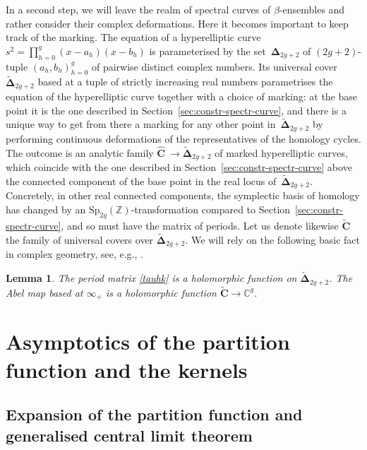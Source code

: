 \documentclass[10pt,a4paper]{amsart}
\numberwithin{equation}{section}
\newtheorem{Lemma}[Theorem]{Lemma}
\begin{document}
In a second step, we will leave the realm of spectral curves of
$\beta$-ensembles and rather consider their complex deformations. Here it becomes important to keep track of the marking.
The equation of a hyperelliptic curve $s^2 = \prod_{h = 0}^{g} (x - a_h)(x - b_h)$ is parameterised by the set~$\bm{\Delta}_{2g + 2}$ of $(2g + 2)$-tuple $(a_h,b_h)_{h = 0}^{g}$ of pairwise distinct complex numbers. Its universal cover~$\widetilde{\bm{\Delta}}_{2g + 2}$ based at a tuple of strictly increasing real numbers parametrises the equation of the hyperelliptic curve together with a choice of marking: at the base point it is the one described in Section~\ref{sec:constr-spectr-curve}, and there is a unique way to get from there a marking for any other point in~$\widetilde{\bm{\Delta}}_{2g + 2}$ by performing continuous deformations of the representatives of the homology cycles. The outcome is an analytic family $\hat{\bm{C}}~\rightarrow \widetilde{\bm{\Delta}}_{2g + 2}$ of marked hyperelliptic curves, which coincide with the one described in Section~\ref{sec:constr-spectr-curve} above the connected component of the base point in the real locus of~$\widetilde{\bm{\Delta}}_{2g + 2}$. Concretely, in other real connected components, the symplectic basis of homology has changed by an $\text{Sp}_{2g}(\mathbb{Z})$-transformation compared to Section~\ref{sec:constr-spectr-curve}, and so must have the matrix of periods. Let us denote likewise $\widetilde{\bm{C}}$ the family of universal covers over $\widetilde{\bm{\Delta}}_{2g + 2}$. We will rely on the following basic fact in complex geometry, see, e.g., \cite[Chapter
1]{period-book}.
\begin{Lemma}\label{lem:holo-periods}
 The period matrix \eqref{tauhk} is a holomorphic function on $\widetilde{\bm{\Delta}}_{2g + 2}$. The Abel map based at $\infty_+$ is a holomorphic function $\widetilde{\bm{C}} \rightarrow \mathbb{C}^{g}$.
\end{Lemma}



\section{Asymptotics of the partition function and the kernels}

\label{sec:expans-part}
\subsection{Expansion of the partition function and generalised central limit theorem}
\label{sec:expans-part-funct}
\end{document}
